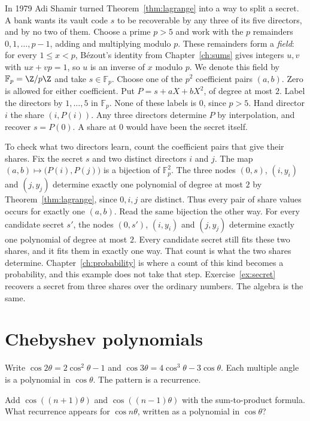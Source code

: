 \begin{examplex}
In 1979 Adi Shamir turned Theorem~\ref{thm:lagrange} into a way to split a secret. A bank wants its vault code $s$ to be recoverable by any three of its five directors, and by no two of them. Choose a prime $p>5$ and work with the $p$ remainders $0,1,\dots,p-1$, adding and multiplying modulo $p$. These remainders form a \emph{field}: for every $1\le x<p$, B\'ezout's identity from Chapter~\ref{ch:sums} gives integers $u,v$ with $ux+vp=1$, so $u$ is an inverse of $x$ modulo $p$. We denote this field by $\mathbb F_p=\Z/p\Z$ and take $s\in\mathbb F_p$. Choose one of the $p^2$ coefficient pairs $(a,b)$. Zero is allowed for either coefficient. Put $P=s+aX+bX^2$, of degree at most $2$. Label the directors by $1,\ldots,5$ in $\mathbb F_p$. None of these labels is $0$, since $p>5$. Hand director $i$ the share $(i,P(i))$. Any three directors determine $P$ by interpolation, and recover $s=P(0)$. A share at $0$ would have been the secret itself.
\end{examplex}

To check what two directors learn, count the coefficient pairs that give their shares. Fix the secret $s$ and two distinct directors $i$ and $j$. The map $(a,b)\mapsto\bigl(P(i),P(j)\bigr)$ is a bijection of $\mathbb F_p^2$. The three nodes $(0,s)$, $(i,y_i)$ and $(j,y_j)$ determine exactly one polynomial of degree at most $2$ by Theorem~\ref{thm:lagrange}, since $0,i,j$ are distinct. Thus every pair of share values occurs for exactly one $(a,b)$. Read the same bijection the other way. For every candidate secret $s'$, the nodes $(0,s')$, $(i,y_i)$ and $(j,y_j)$ determine exactly one polynomial of degree at most $2$. Every candidate secret still fits these two shares, and it fits them in exactly one way. That count is what the two shares determine. Chapter~\ref{ch:probability} is where a count of this kind becomes a probability, and this example does not take that step. Exercise~\ref{ex:secret} recovers a secret from three shares over the ordinary numbers. The algebra is the same.

\section{Chebyshev polynomials}

Write $\cos2\theta=2\cos^2\theta-1$ and $\cos3\theta=4\cos^3\theta-3\cos\theta$. Each multiple angle is a polynomial in $\cos\theta$. The pattern is a recurrence.

\begin{think}
Add $\cos((n+1)\theta)$ and $\cos((n-1)\theta)$ with the sum-to-product formula. What recurrence appears for $\cos n\theta$, written as a polynomial in $\cos\theta$?
\end{think}

